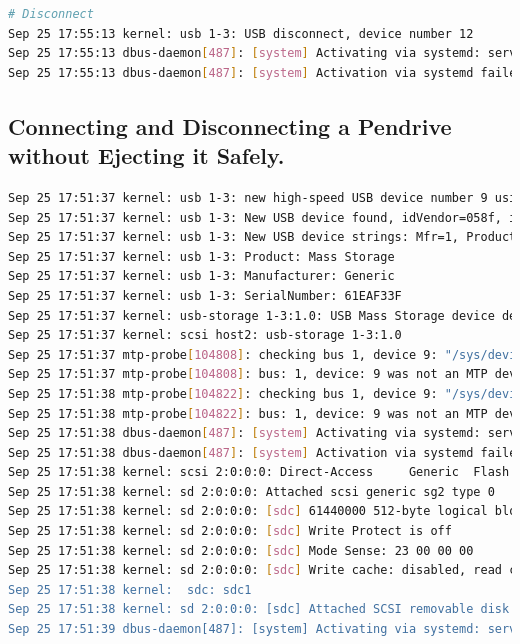 \documentclass[11pt]{article}
\begin{document}
\begin{lstlisting}[language=bash]
# Disconnect 
Sep 25 17:55:13 kernel: usb 1-3: USB disconnect, device number 12
Sep 25 17:55:13 dbus-daemon[487]: [system] Activating via systemd: service name='org.freedesktop.Avahi' unit='dbus-org.freedesktop.Avahi.service' requested by ':1.323' (uid=969 pid=105780 comm="/usr/lib/colord-sane")
Sep 25 17:55:13 dbus-daemon[487]: [system] Activation via systemd failed for unit 'dbus-org.freedesktop.Avahi.service': Unit dbus-org.freedesktop.Avahi.service not found.
\end{lstlisting}
\subsection{Connecting and Disconnecting a Pendrive without Ejecting it Safely. }

\begin{lstlisting}[language=bash]
Sep 25 17:51:37 kernel: usb 1-3: new high-speed USB device number 9 using xhci_hcd
Sep 25 17:51:37 kernel: usb 1-3: New USB device found, idVendor=058f, idProduct=6387, bcdDevice= 1.00
Sep 25 17:51:37 kernel: usb 1-3: New USB device strings: Mfr=1, Product=2, SerialNumber=3
Sep 25 17:51:37 kernel: usb 1-3: Product: Mass Storage
Sep 25 17:51:37 kernel: usb 1-3: Manufacturer: Generic
Sep 25 17:51:37 kernel: usb 1-3: SerialNumber: 61EAF33F
Sep 25 17:51:37 kernel: usb-storage 1-3:1.0: USB Mass Storage device detected
Sep 25 17:51:37 kernel: scsi host2: usb-storage 1-3:1.0
Sep 25 17:51:37 mtp-probe[104808]: checking bus 1, device 9: "/sys/devices/pci0000:00/0000:00:14.0/usb1/1-3"
Sep 25 17:51:37 mtp-probe[104808]: bus: 1, device: 9 was not an MTP device
Sep 25 17:51:38 mtp-probe[104822]: checking bus 1, device 9: "/sys/devices/pci0000:00/0000:00:14.0/usb1/1-3"
Sep 25 17:51:38 mtp-probe[104822]: bus: 1, device: 9 was not an MTP device
Sep 25 17:51:38 dbus-daemon[487]: [system] Activating via systemd: service name='org.freedesktop.Avahi' unit='dbus-org.freedesktop.Avahi.service' requested by ':1.299' (uid=969 pid=104820 comm="/usr/lib/colord-sane")
Sep 25 17:51:38 dbus-daemon[487]: [system] Activation via systemd failed for unit 'dbus-org.freedesktop.Avahi.service': Unit dbus-org.freedesktop.Avahi.service not found.
Sep 25 17:51:38 kernel: scsi 2:0:0:0: Direct-Access     Generic  Flash Disk       8.07 PQ: 0 ANSI: 4
Sep 25 17:51:38 kernel: sd 2:0:0:0: Attached scsi generic sg2 type 0
Sep 25 17:51:38 kernel: sd 2:0:0:0: [sdc] 61440000 512-byte logical blocks: (31.5 GB/29.3 GiB)
Sep 25 17:51:38 kernel: sd 2:0:0:0: [sdc] Write Protect is off
Sep 25 17:51:38 kernel: sd 2:0:0:0: [sdc] Mode Sense: 23 00 00 00
Sep 25 17:51:38 kernel: sd 2:0:0:0: [sdc] Write cache: disabled, read cache: enabled, doesn't support DPO or FUA
Sep 25 17:51:38 kernel:  sdc: sdc1
Sep 25 17:51:38 kernel: sd 2:0:0:0: [sdc] Attached SCSI removable disk
Sep 25 17:51:39 dbus-daemon[487]: [system] Activating via systemd: service name='org.freedesktop.Avahi' unit='dbus-org.freedesktop.Avahi.service' requested by ':1.301' (uid=969 pid=104843 comm="/usr/lib/colord-sane")


\end{lstlisting}
\end{document}
